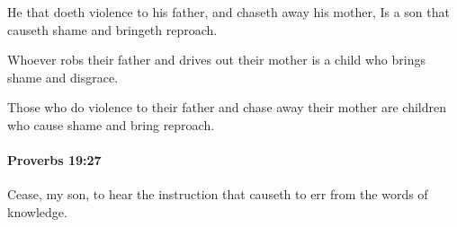 			\begin{versebox}
					\item[BHS] 
					\item[ASV] He that doeth violence to his father, and chaseth away his mother, Is a son that causeth shame and bringeth reproach.
					\item[NIV] Whoever robs their father and drives out their mother is a child who brings shame and disgrace.
					\item[NRSV] Those who do violence to their father and chase away their mother are children who cause shame and bring reproach.
			\end{versebox}

		\paragraph{Proverbs 19:27} %
			\label{PROVERBS-19-27}

			Cease, my son, to hear the instruction that causeth to err from the words of knowledge.

